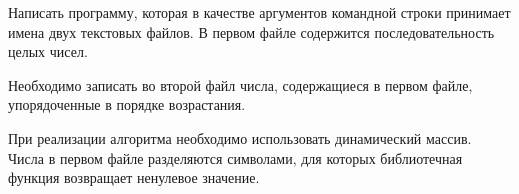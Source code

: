 

Написать программу, которая в качестве аргументов командной строки
принимает имена двух текстовых файлов. В первом файле содержится
последовательность целых чисел.

Необходимо записать во второй файл
числа, содержащиеся в первом файле, упорядоченные в порядке
возрастания.

При реализации алгоритма необходимо использовать
динамический массив. Числа в первом файле разделяются символами, для
которых библиотечная функция  возвращает ненулевое значение.
